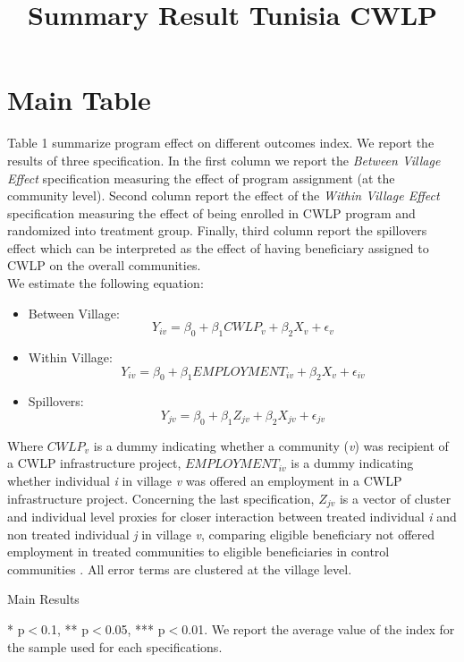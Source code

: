 \documentclass[10pt,a4paper]{article}
\begin{document}
	
	\title{Summary Result Tunisia CWLP}\maketitle
	
	\pagebreak
	
	\tableofcontents
	
	\pagebreak
	
\section{Main Table}

Table 1 summarize program effect on different outcomes index. We report the results of three specification. In the first column we report the \textit{Between Village Effect} specification measuring the effect of program assignment (at the community level). Second column report the effect of the \textit{Within Village Effect} specification measuring the effect of being enrolled in CWLP program and randomized into treatment group. Finally, third column report the spillovers effect which can be interpreted as the effect of having beneficiary assigned to CWLP on the overall communities. \\


We estimate the following equation:
\begin{itemize}
	\item Between Village: \begin{equation} Y_{iv} = \beta_{0} + \beta_{1}CWLP_{v} + \beta_{2}X_{v} + \epsilon_{v} \end{equation}
	
	\item Within Village: \begin{equation} Y_{iv} = \beta_{0} + \beta_{1}EMPLOYMENT_{iv} + \beta_{2}X_{v} + \epsilon_{iv} \end{equation}
	
	\item Spillovers: \begin{equation} Y_{jv} = \beta_{0} + \beta_{1}Z_{jv} + \beta_{2}X_{jv} + \epsilon_{jv} \end{equation}
\end{itemize}

Where $CWLP_{v}$ is a dummy indicating whether a community (\textit{v}) was recipient of a CWLP infrastructure project, $EMPLOYMENT_{iv}$ is a dummy indicating whether individual \textit{i} in village \textit{v} was offered an employment in a CWLP infrastructure project. Concerning the last specification, $Z_{jv}$ is a vector of cluster and individual level proxies for closer interaction between treated individual \textit{i} and non treated individual \textit{j} in village \textit{v}, comparing eligible beneficiary not offered employment in treated communities to eligible beneficiaries in control communities . All error terms are clustered at the village level. 


\begin{table}[H]\centering\caption{Main Results} 
	\resizebox{\textwidth}{!}{}\caption*{\footnotesize{* p$<$0.1, ** p$<$0.05, *** p$<$0.01. We report the average value of the index for the sample used for each specifications.}}
\end{table}
\end{document}
